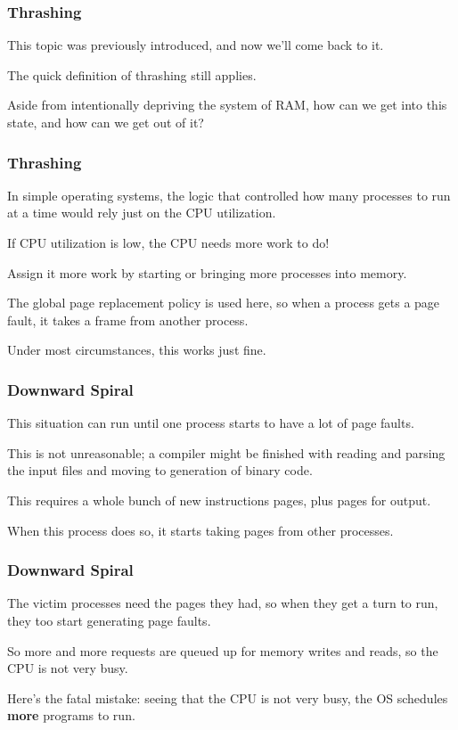 \begin{frame}
\frametitle{Thrashing}
This topic was previously introduced, and now we'll come back to it.

The quick definition of thrashing still applies.

Aside from intentionally depriving the system of RAM, how can we get into this state, and how can we get out of it?


\end{frame}

\begin{frame}
\frametitle{Thrashing}

In simple operating systems, the logic that controlled how many processes to run at a time would rely just on the CPU utilization. 

If CPU utilization is low, the CPU needs more work to do! 

Assign it more work by starting or bringing more processes into memory. 

The global page replacement policy is used here, so when a process gets a page fault, it takes a frame from another process. 

Under most circumstances, this works just fine.

\end{frame}

\begin{frame}
\frametitle{Downward Spiral}

This situation can run until one process starts to have a lot of page faults. 

This is not unreasonable; a compiler might be finished with reading and parsing the input files and moving to generation of binary code. 

This requires a whole bunch of new instructions pages, plus pages for output. 

When this process does so, it starts taking pages from other processes.

\end{frame}

\begin{frame}
\frametitle{Downward Spiral}

The victim processes need the pages they had, so when they get a turn to run, they too start generating page faults. 

So more and more requests are queued up for memory writes and reads, so the CPU is not very busy. 

Here's the fatal mistake: seeing that the CPU is not very busy, the OS schedules \textbf{more} programs to run.  

\end{frame}

